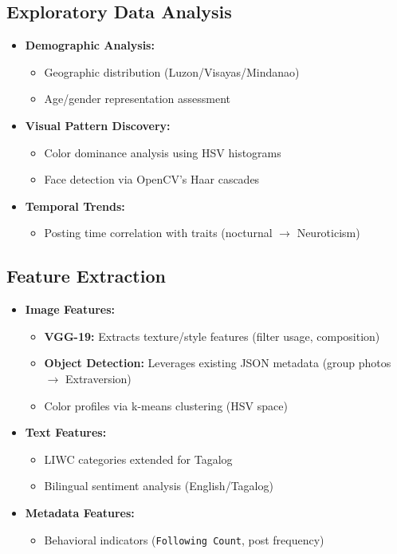 \subsection{Exploratory Data Analysis}
\label{subsec:eda}

\begin{itemize}
	\item \textbf{Demographic Analysis:} 
	\begin{itemize}
		\item Geographic distribution (Luzon/Visayas/Mindanao)
		\item Age/gender representation assessment
	\end{itemize}
	
	\item \textbf{Visual Pattern Discovery:}
	\begin{itemize}
		\item Color dominance analysis using HSV histograms
		\item Face detection via OpenCV's Haar cascades
	\end{itemize}
	
	\item \textbf{Temporal Trends:}
	\begin{itemize}
		\item Posting time correlation with traits (nocturnal $\rightarrow$ Neuroticism)
	\end{itemize}
\end{itemize}

\subsection{Feature Extraction}
\label{subsec:features}

\begin{itemize}
	\item \textbf{Image Features:}
	\begin{itemize}
		\item \textbf{VGG-19:} Extracts texture/style features (filter usage, composition)
		\item \textbf{Object Detection:} Leverages existing JSON metadata (group photos $\rightarrow$ Extraversion)
		\item Color profiles via k-means clustering (HSV space)
	\end{itemize}
	
	\item \textbf{Text Features:}
	\begin{itemize}
		\item LIWC categories extended for Tagalog
		\item Bilingual sentiment analysis (English/Tagalog)
	\end{itemize}
	
	\item \textbf{Metadata Features:}
	\begin{itemize}
		\item Behavioral indicators (\texttt{Following Count}, post frequency)
	\end{itemize}
\end{itemize}

